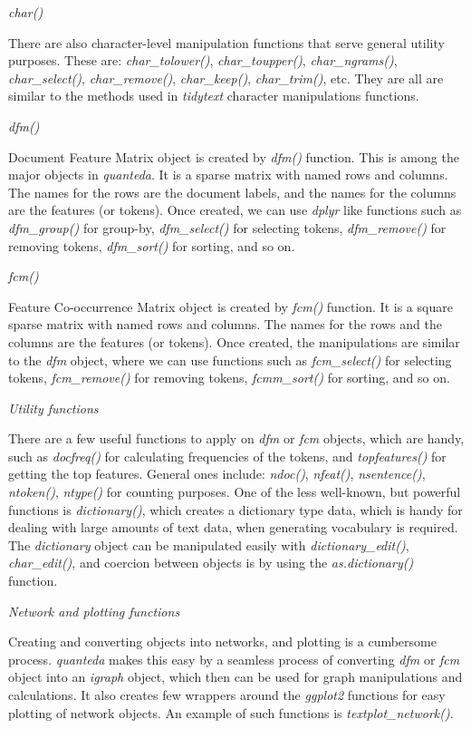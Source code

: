\documentclass[
]{article}
\begin{document}
\emph{char()}

There are also character-level manipulation functions that serve general utility purposes. These are: \emph{char\_tolower()}, \emph{char\_toupper()}, \emph{char\_ngrams()}, \emph{char\_select()}, \emph{char\_remove()}, \emph{char\_keep()}, \emph{char\_trim()}, etc. They are all are similar to the methods used in \emph{tidytext} character manipulations functions.

\emph{dfm()}

Document Feature Matrix object is created by \emph{dfm()} function. This is among the major objects in \emph{quanteda}. It is a sparse matrix with named rows and columns. The names for the rows are the document labels, and the names for the columns are the features (or tokens). Once created, we can use \emph{dplyr} like functions such as \emph{dfm\_group()} for group-by, \emph{dfm\_select()} for selecting tokens, \emph{dfm\_remove()} for removing tokens, \emph{dfm\_sort()} for sorting, and so on.

\emph{fcm()}

Feature Co-occurrence Matrix object is created by \emph{fcm()} function. It is a square sparse matrix with named rows and columns. The names for the rows and the columns are the features (or tokens). Once created, the manipulations are similar to the \emph{dfm} object, where we can use functions such as \emph{fcm\_select()} for selecting tokens, \emph{fcm\_remove()} for removing tokens, \emph{fcmm\_sort()} for sorting, and so on.

\emph{Utility functions}

There are a few useful functions to apply on \emph{dfm} or \emph{fcm} objects, which are handy, such as \emph{docfreq()} for calculating frequencies of the tokens, and \emph{topfeatures()} for getting the top features. General ones include: \emph{ndoc()}, \emph{nfeat()}, \emph{nsentence()}, \emph{ntoken()}, \emph{ntype()} for counting purposes. One of the less well-known, but powerful functions is \emph{dictionary()}, which creates a dictionary type data, which is handy for dealing with large amounts of text data, when generating vocabulary is required. The \emph{dictionary} object can be manipulated easily with \emph{dictionary\_edit()}, \emph{char\_edit()}, and coercion between objects is by using the \emph{as.dictionary()} function.

\emph{Network and plotting functions}

Creating and converting objects into networks, and plotting is a cumbersome process. \emph{quanteda} makes this easy by a seamless process of converting \emph{dfm} or \emph{fcm} object into an \emph{igraph} object, which then can be used for graph manipulations and calculations. It also creates few wrappers around the \emph{ggplot2} functions for easy plotting of network objects. An example of such functions is \emph{textplot\_network()}.
\end{document}
